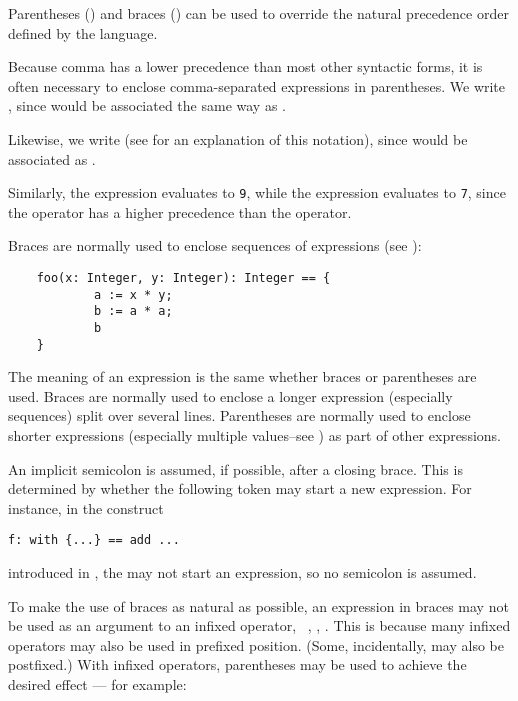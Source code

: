 Parentheses (\ttin{( )}) and braces (\ttin{\{ \}}) can be used to override
the natural precedence order defined by the language.

Because comma has a lower precedence than most other
syntactic forms, it is often necessary to enclose comma-separated
expressions in parentheses.  We write , since
 would be associated the same way as .

Likewise, we write 
(see  for an
explanation of this notation),
since  would be associated as . 

Similarly, the expression  evaluates to {\tt 9},
while the expression  evaluates to {\tt 7}, since
the \ttin{*} operator has a higher precedence than the \ttin{+} operator.

Braces are normally used to enclose sequences of expressions
(see ):

\begin{small}
\begin{verbatim}
    foo(x: Integer, y: Integer): Integer == {
            a := x * y;
            b := a * a;
            b
    }
\end{verbatim}
\end{small}

The meaning of an expression is the same whether braces or parentheses
are used.  Braces are normally used to enclose a longer expression
(especially sequences) split over several lines.
Parentheses are normally used to enclose shorter expressions
(especially multiple values--see )
as part of other expressions.


An implicit semicolon is assumed, if possible, after a closing brace.
This is determined by whether the following token may start a new
expression. For instance, in the construct

\begin{small}
\begin{verbatim}
f: with {...} == add ...
\end{verbatim}
\end{small}

introduced in , the \ttin{==} may not start an
expression, so no semicolon is assumed.

To make the use of braces as natural as possible, an expression
in braces may not be used as an argument to an infixed operator,
\eg{}~\ttin{+}, \ttin{-}, .
This is because many infixed operators may also be used in prefixed
position.  (Some, incidentally, may also be postfixed.)  With
infixed operators, parentheses may be used to achieve the
desired effect --- for example:

